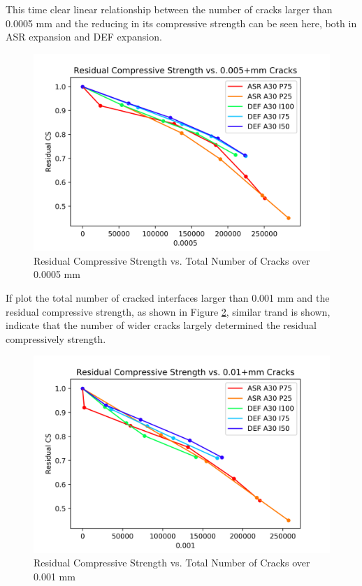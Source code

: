This time clear linear relationship between the number of cracks larger than 0.0005 mm and the reducing in its compressive strength can be seen here, both in ASR expansion and DEF expansion.

\begin{figure}[ht!]
\centering
\includegraphics[width=.8\linewidth]{Files/exp_3D/Residual_Compressive_Strength_vs_Total_Number_of_0005_Cracks.png}
  \caption{Residual Compressive Strength vs. Total Number of Cracks over 0.0005 mm}
  \label{fig:Total_Number_of_Cracks_0.0005+}
\end{figure}

If plot the total number of cracked interfaces larger than 0.001 mm and the residual compressive strength, as shown in Figure \ref{fig:Total_Number_of_Cracks_0.001+}, similar trand is shown, indicate that the number of wider cracks largely determined the residual compressively strength.
\begin{figure}[ht!]
\centering
\includegraphics[width=.8\linewidth]{Files/exp_3D/Residual_Compressive_Strength_vs_Total_Number_of_001_Cracks.png}
  \caption{Residual Compressive Strength vs. Total Number of Cracks over 0.001 mm}
  \label{fig:Total_Number_of_Cracks_0.001+}
\end{figure}

